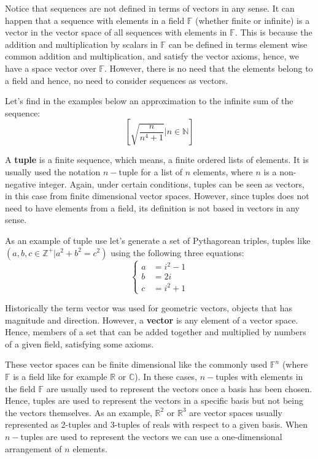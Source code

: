 Notice that sequences are not defined in terms of vectors in any sense. 
It can happen that a sequence with elements in a field $\mathbb{F}$ 
(whether finite or infinite)
is a vector in the vector space of all sequences with elements in $\mathbb{F}$.
This is because the addition and multiplication by scalars in $\mathbb{F}$ 
can be defined in terms element wise common addition and multiplication, 
and satisfy the vector axioms, hence, we have a space vector over $\mathbb{F}$.
However, there is no need that the elements belong to a field and hence, no need 
to consider sequences as vectors. 

Let's find in the examples below an approximation to the infinite sum of the sequence: 
$$
\left[\sqrt{\frac{n}{n^4+1}}| n\in\mathbb{N}\right]
$$



A \textbf{tuple} is a finite sequence, which means, a finite ordered lists of elements. 
It is usually used the notation $n-$tuple for a list of $n$ elements, where $n$ is a non-negative integer.
Again, under certain conditions, tuples can be seen as vectors, in this case from finite dimensional vector spaces. 
However, since tuples does not need to have elements from a field, its definition is not based in vectors in any sense. 

As an example of tuple use let's generate a set of Pythagorean triples, 
tuples like $\left(a,b,c\in\mathbb{Z}^+|a^2 + b^2 = c^2\right)$ using the following three equations:
\begin{equation}
    \begin{cases}
        a  & = i^2 - 1\\
        b & = 2i\\
        c & = i^2+1
    \end{cases}       
\end{equation}

Historically the term vector was used for geometric vectors, objects that has magnitude and direction.
However, a \textbf{vector} is any element of a vector space. 
Hence, members of a set that can be added together and multiplied by numbers of a given field, satisfying some axioms.

These vector spaces can be finite dimensional like the commonly used $\mathbb{F}^{n}$ 
(where $\mathbb{F}$ is a field like for example $\mathbb{R}$ or $\mathbb{C}$).
In these cases, $n-$tuples with elements in the field $\mathbb{F}$ are usually used to represent the vectors once a basis has been chosen. 
Hence, tuples are used to represent the vectors in a specific basis but not being the vectors themselves.
As an example, $\mathbb{R}^{2}$ or $\mathbb{R}^{3}$ are vector spaces 
usually represented as 2-tuples and 3-tuples of reals with respect to a given basis.
When $n-$tuples are used to represent the vectors we can use a one-dimensional arrangement of $n$ elements.

